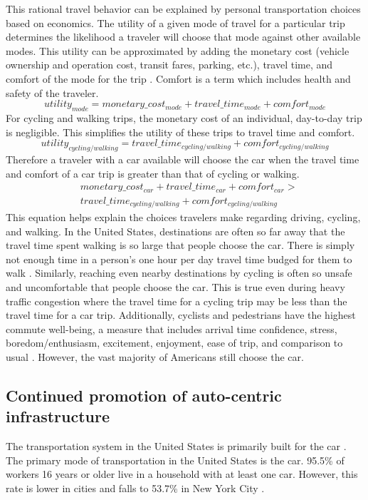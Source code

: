 \documentclass{article}
\begin{document}
This rational travel behavior can be explained by personal transportation choices based on economics. The utility of a given mode of travel for a particular trip determines the likelihood a traveler will choose that mode against other available modes. This utility can be approximated by adding the monetary cost (vehicle ownership and operation cost, transit fares, parking, etc.), travel time, and comfort of the mode for the trip \citep{litman2016}. Comfort is a term which includes health and safety of the traveler.
\begin{equation}
  utility_{mode} = monetary\_cost_{mode} + travel\_time_{mode} + comfort_{mode}
\end{equation}
For cycling and walking trips, the monetary cost of an individual, day-to-day trip is negligible. This simplifies the utility of these trips to travel time and comfort.
\begin{equation}
  utility_{cycling/walking} = travel\_time_{cycling/walking} + comfort_{cycling/walking}
\end{equation}
Therefore a traveler with a car available will choose the car when the travel time and comfort of a car trip is greater than that of cycling or walking.
\begin{align}
  & monetary\_cost_{car} + travel\_time_{car} + comfort_{car} > \nonumber \\
  & travel\_time_{cycling/walking} + comfort_{cycling/walking}
\end{align}
This equation helps explain the choices travelers make regarding driving, cycling, and walking. In the United States, destinations are often so far away that the travel time spent walking is so large that people choose the car. There is simply not enough time in a person's one hour per day travel time budged for them to walk \citep[Page 36]{zahavi1974}. Similarly, reaching even nearby destinations by cycling is often so unsafe and uncomfortable that people choose the car. This is true even during heavy traffic congestion where the travel time for a cycling trip may be less than the travel time for a car trip. Additionally, cyclists and pedestrians have the highest commute well-being, a measure that includes arrival time confidence, stress, boredom/enthusiasm, excitement, enjoyment, ease of trip, and comparison to usual \citep[Page 4-5]{smith2016}. However, the vast majority of Americans still choose the car.

\subsection*{Continued promotion of auto-centric infrastructure}
The transportation system in the United States is primarily built for the car \citep[Page 1]{sciara2003}.
The primary mode of transportation in the United States is the car. 95.5\% of workers 16 years or older live in a household with at least one car. However, this rate is lower in cities and falls to 53.7\% in New York City \citep{uscb2016}.
\end{document}

